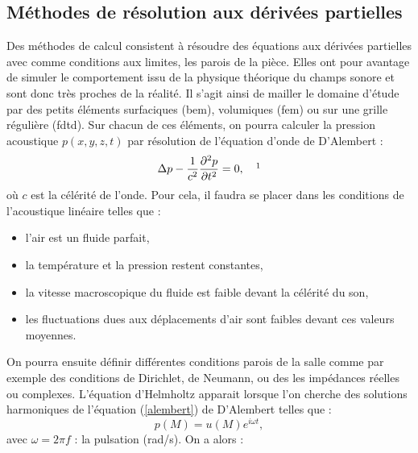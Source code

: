 	\subsection{Méthodes de résolution aux dérivées partielles} \label{sect_resExacte}

Des méthodes de calcul consistent à résoudre des équations aux dérivées partielles avec comme conditions aux limites, les parois de la pièce. Elles ont pour avantage de simuler le comportement issu de la physique théorique du champs sonore et sont donc très proches de la réalité. Il s'agit ainsi de mailler le domaine d'étude par des petits éléments surfaciques (\gls{bem}), volumiques (\gls{fem}) ou sur une grille régulière (\gls{fdtd}). Sur chacun de ces éléments, on pourra calculer la pression acoustique $p(x,y,z,t)$ par résolution de l'équation d'onde de D'Alembert :
\begin{align} 
\Delta p-\frac{1}{c^2}\frac{\partial^2p}{\partial t^2} = 0, \ \ \ \footnotemark
\label{alembert}
\end{align}
où $c$ est la célérité de l'onde. Pour cela, il faudra se placer dans les conditions de l'acoustique linéaire \cite[p. 19]{jot} telles que :
%
\begin{itemize}
\item l'air est un fluide parfait,
\item la température et la pression restent constantes,
\item la vitesse macroscopique du fluide est faible devant la célérité du son,
\item les fluctuations dues aux déplacements d'air sont faibles devant ces valeurs moy\-ennes.
\end{itemize}
%
On pourra ensuite définir différentes conditions parois de la salle comme par exemple des conditions de \gls{Dirichlet}, de \gls{Neumann}, ou des les impédances réelles ou complexes.
L'équation d'Helmholtz apparait lorsque l'on cherche des solutions harmoniques de l'équation (\ref{alembert}) de D'Alembert telles que :
\begin{equation}
p(M) = u(M)e^{i\omega t},
\end{equation}
avec  $\omega = 2\pi f$ : la pulsation (rad/s). On a alors :

